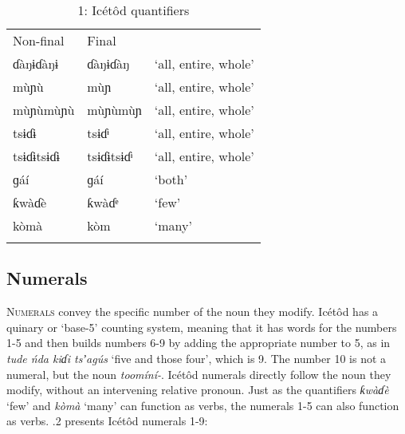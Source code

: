 \begin{table}
\caption{1: Icétôd quantifiers}
\label{tab:3}


\begin{tabularx}{\textwidth}{XXX}
\lsptoprule

Non-final & Final & \\
ɗàŋɨɗàŋɨ & ɗàŋɨɗàŋ & ‘all, entire, whole’\\
mùɲù & mùɲ & ‘all, entire, whole’\\
mùɲùmùɲù & mùɲùmùɲ & ‘all, entire, whole’\\
tsɨɗɨ & tsɨɗᶤ & ‘all, entire, whole’\\
tsɨɗɨtsɨɗɨ & tsɨɗɨtsɨɗᶤ & ‘all, entire, whole’\\
ɡáí & ɡáí & ‘both’\\
ƙwàɗè & ƙwàɗᵉ & ‘few’\\
kòmà & kòm & ‘many’\\
\lspbottomrule
\end{tabularx}
\end{table}



\subsection{Numerals}


\textsc{Numerals} convey the specific number of the noun they modify. Icétôd has a quinary or ‘base-5’ counting system, meaning that it has words for the numbers 1-5 and then builds numbers 6-9 by adding the appropriate number to 5, as in \textit{tude ńda kiɗi tsʼagús} ‘five and those four’, which is 9. The number 10 is not a numeral, but the noun \textit{toomíní-}. Icétôd numerals directly follow the noun they modify, without an intervening relative pronoun. Just as the quantifiers \textit{ƙwàɗè} ‘few’ and \textit{kòmà} ‘many’ can function as verbs, the numerals 1-5 can also function as verbs. .2 presents Icétôd numerals 1-9:


